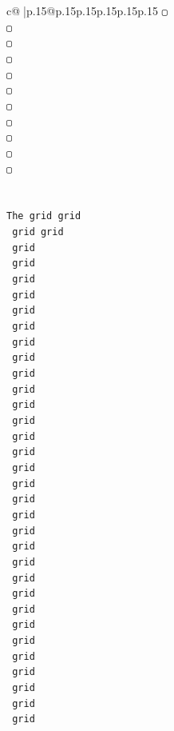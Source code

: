 \documentclass{article}
\begin{document}
{\begin{supertabular}{c@{$\;$}|p{.15\linewidth}@{}p{.15\linewidth}p{.15\linewidth}p{.15\linewidth}p{.15\linewidth}p{.15\linewidth}}
{{{\texttt{▢} \\
\texttt{▢} \\
\texttt{▢} \\
\texttt{▢} \\
\texttt{▢} \\
\texttt{▢} \\
\texttt{▢} \\
\texttt{▢} \\
\texttt{▢} \\
\texttt{▢} \\
\texttt{▢} \\
\\ 
\\ 
\texttt{The grid grid} \\
\texttt{ grid grid} \\
\texttt{ grid} \\
\texttt{ grid} \\
\texttt{ grid} \\
\texttt{ grid} \\
\texttt{ grid} \\
\texttt{ grid} \\
\texttt{ grid} \\
\texttt{ grid} \\
\texttt{ grid} \\
\texttt{ grid} \\
\texttt{ grid} \\
\texttt{ grid} \\
\texttt{ grid} \\
\texttt{ grid} \\
\texttt{ grid} \\
\texttt{ grid} \\
\texttt{ grid} \\
\texttt{ grid} \\
\texttt{ grid} \\
\texttt{ grid} \\
\texttt{ grid} \\
\texttt{ grid} \\
\texttt{ grid} \\
\texttt{ grid} \\
\texttt{ grid} \\
\texttt{ grid} \\
\texttt{ grid} \\
\texttt{ grid} \\
\texttt{ grid} \\
\texttt{ grid} \\
\texttt{ grid} \\
}}}
\end{supertabular}}
\end{document}
